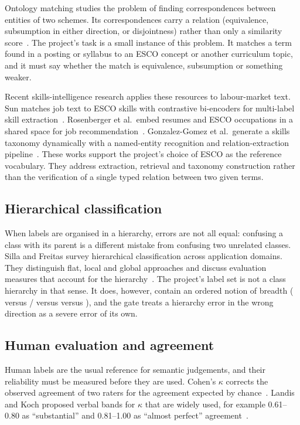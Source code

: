 Ontology matching studies the problem of finding correspondences between entities of two schemes. Its correspondences carry a relation (equivalence, subsumption in either direction, or disjointness) rather than only a similarity score~\cite{euzenat2013}. The project's task is a small instance of this problem. It matches a term found in a posting or syllabus to an ESCO concept or another curriculum topic, and it must say whether the match is equivalence, subsumption or something weaker.

Recent skills-intelligence research applies these resources to labour-market text. Sun matches job text to ESCO skills with contrastive bi-encoders for multi-label skill extraction~\cite{sun2026}. Rosenberger et al.\ embed resumes and ESCO occupations in a shared space for job recommendation~\cite{rosenberger2025}. Gonzalez-Gomez et al.\ generate a skills taxonomy dynamically with a named-entity recognition and relation-extraction pipeline~\cite{gonzalezgomez2025}. These works support the project's choice of ESCO as the reference vocabulary. They address extraction, retrieval and taxonomy construction rather than the verification of a single typed relation between two given terms.

\subsection{Hierarchical classification}

When labels are organised in a hierarchy, errors are not all equal: confusing a class with its parent is a different mistake from confusing two unrelated classes. Silla and Freitas survey hierarchical classification across application domains. They distinguish flat, local and global approaches and discuss evaluation measures that account for the hierarchy~\cite{silla2011}. The project's label set is not a class hierarchy in that sense. It does, however, contain an ordered notion of breadth (\SC{} versus \PA/\CH{} versus \PO{} versus \RE), and the gate treats a hierarchy error in the wrong direction as a severe error of its own.

\subsection{Human evaluation and agreement}

Human labels are the usual reference for semantic judgements, and their reliability must be measured before they are used. Cohen's $\kappa$ corrects the observed agreement of two raters for the agreement expected by chance~\cite{cohen1960}. Landis and Koch proposed verbal bands for $\kappa$ that are widely used, for example 0.61--0.80 as ``substantial'' and 0.81--1.00 as ``almost perfect'' agreement~\cite{landis1977}.

